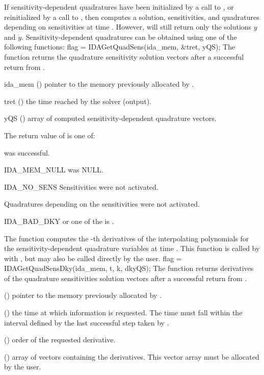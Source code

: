 If sensitivity-dependent quadratures have been initialized by a call to ,
or reinitialized by a call to , then {\idas} computes a solution,
sensitivities, and quadratures depending on sensitivities at time . However, 
 will still return only the solutions $y$ and $\dot{y}$. Sensitivity-dependent 
quadratures can be obtained using one of the following functions:
{
  flag = IDAGetQuadSens(ida\_mem, \&tret, yQS);
}
{
  The function  returns the quadrature sensitivity
  solution vectors after a successful return from .
}
{
  \begin{args}
  \item[ida\_mem] ()
    pointer to the memory previously allocated by .
  \item[tret] ()
    the time reached by the solver (output).
  \item[yQS] ()
    array of  computed sensitivity-dependent quadrature vectors.
  \end{args}
}
{
  The return value  of  is one of:
  \begin{args}
  \item[\Id{IDA\_SUCCESS}] 
     was successful.
  \item[IDA\_MEM\_NULL] 
     was NULL.
  \item[IDA\_NO\_SENS]
    Sensitivities were not activated.
  \item[\Id{IDA\_NO\_QUADSENS}] 
    Quadratures depending on the sensitivities were not activated.
  \item[IDA\_BAD\_DKY]
     or one of the  is .
  \end{args}
}
{}
The function  computes the -th derivatives of the interpolating 
polynomials for the sensitivity-dependent quadrature variables at time .
This function is called by  with , but may also be called 
directly by the user.
{
  flag = IDAGetQuadSensDky(ida\_mem, t, k, dkyQS);
}
{
  The function  returns derivatives of the quadrature sensitivities 
  solution vectors after a successful return from .
}
{
  \begin{args}
  \item[\id{ida\_mem}] ()
    pointer to the memory previously allocated by .
  \item[\id{t}] ()
    the time at which information is requested. The time  must fall within the 
    interval defined by the last successful step taken by {\idas}.
  \item[\id{k}] () order of the requested derivative.
  \item[\id{dkyQS}] ()
    array of  vectors containing the derivatives. This vector
    array must be allocated by the user. 
  \end{args}
}
